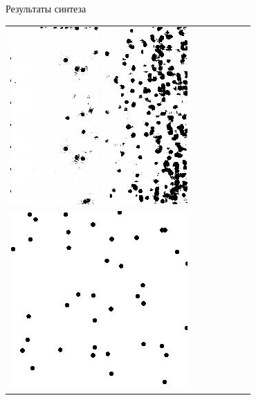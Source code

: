 \documentclass[12pt]{beamer}
\begin{document}
\begin{frame}{Результаты синтеза}
\begin{table}
\begin{center}
\begin{tabular}{p{1.2cm} p{1.2cm} p{1.2cm} p{1.2cm} p{1.2cm} p{1.2cm} p{1.2cm}}
					\includegraphics[width=1\linewidth]{8-results/sand-trend2/nf32/gen1}
					\\
					\includegraphics[width=1\linewidth]{8-results/sand-trend2/left2}

\end{tabular}
\end{center}
\end{table}
\end{frame}
\end{document}
